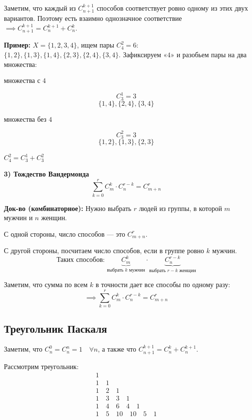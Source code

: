 \documentclass[10pt, a4paper]{article}
\begin{document}
\noindent Заметим, что каждый из $C_{n+1}^{k+1}$ способов соответствует ровно одному из этих двух вариантов. Поэтому есть взаимно однозначное соответствие $\implies C_{n+1}^{k+1} = C_n^{k+1} + C_n^k$.

\vspace{0.2cm}
\vspace{0.2cm}
\noindent \textbf{Пример:} $X = \{1, 2, 3, 4\}$, ищем пары $C_4^2 = 6$: $\{1, 2\}, \{1, 3\}, \{1, 4\}, \{2, 3\}, \{2, 4\}, \{3, 4\}$. Зафиксируем «$4$» и разобьем пары на два множества:

\begin{minipage}[t]{0.55\textwidth}
    \centerline{\small множества с $4$}
    $$C_3^1 = 3$$
    $$\{1, 4\}, \{2, 4\}, \{3, 4\}$$
\end{minipage}
\hspace{0.5cm}
\begin{minipage}[t]{0.15\textwidth}
    \centerline{\small множества без $4$}
    $$C_3^2 = 3$$
    $$\{1, 2\}, \{1, 3\}, \{2, 3\}$$
\end{minipage}

\centerline{$C_4^2 = C_3^1 + C_3^2$}

\noindent \textbf{3) Тождество Вандермонда}
$$\sum_{k=0}^{r} C_m^k \cdot C_n^{r-k} = C_{m+n}^r$$

\noindent \textbf{Док-во (комбинаторное):} 
Нужно выбрать $r$ людей из группы, в которой $m$ мужчин и $n$ женщин.

\noindent С одной стороны, число способов — это $C_{m+n}^r$.

\noindent С другой стороны, посчитаем число способов, если в группе ровно $k$ мужчин. 
$$\text{Таких способов: } \underbrace{C_m^k}_{\text{выбрать } k \text{ мужчин}} \cdot \underbrace{C_n^{r-k}}_{\text{выбрать } r-k \text{ женщин}}$$

\noindent Заметим, что сумма по всем $k$ в точности дает все способы по одному разу:
$$\implies \sum_{k=0}^{r} C_m^k \cdot C_n^{r-k} = C_{m+n}^r$$

\subsection*{Треугольник Паскаля}

\noindent Заметим, что $C_n^0 = C_n^n = 1 \quad \forall n$, а также что $C_{n+1}^{k+1} = C_n^k + C_n^{k+1}$.

\vspace{0.2cm}
\noindent Рассмотрим треугольник:
$$
\begin{gathered}
1 \\
1 \quad 1 \\
1 \quad 2 \quad 1 \\
1 \quad 3 \quad 3 \quad 1 \\
1 \quad 4 \quad 6 \quad 4 \quad 1 \\
1 \quad 5 \quad 10 \quad 10 \quad 5 \quad 1
\end{gathered}
$$
\end{document}
